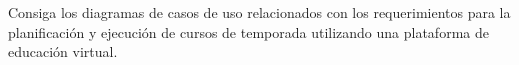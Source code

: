 Consiga los diagramas de casos de uso relacionados con los requerimientos para la planificación y ejecución de cursos de temporada utilizando una plataforma de educación virtual.

